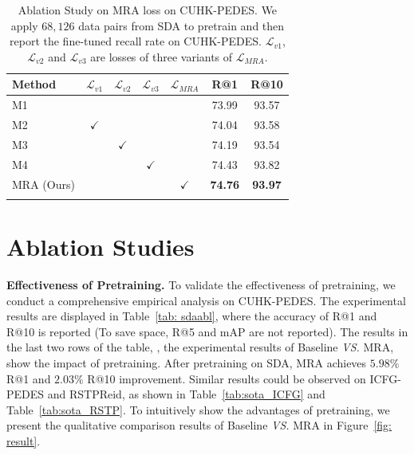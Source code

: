 \begin{table}[!t]
\caption{Ablation Study on MRA loss on CUHK-PEDES. We apply $68,126$ data pairs from SDA to pretrain and then report the fine-tuned recall rate on CUHK-PEDES. $\mathcal{L}_{v1}$, $\mathcal{L}_{v2}$ and $\mathcal{L}_{v3}$ are losses of three variants of $\mathcal{L}_{MRA}$.
}
\label{tab: abl}
\footnotesize
\centering
\begin{tabular}{l|cccc|cc}
\shline
Method & $\mathcal{L}_{v1}$ & $\mathcal{L}_{v2}$ & $\mathcal{L}_{v3}$ & $\mathcal{L}_{MRA}$ & R@1 & R@10 \\
\hline
M1   & & & &              & 73.99 & 93.57 \\
M2   & $\checkmark$ & & & & 74.04 & 93.58 \\
M3   & & $\checkmark$ & & & 74.19 & 93.54 \\
M4   & & & $\checkmark$ & & 74.43 & 93.82 \\
\hline
MRA (Ours)  & & & & $\checkmark$ & \textbf{74.76} & \textbf{93.97} \\
\shline
\end{tabular}
\end{table}



\section{Ablation Studies}

\noindent \textbf{Effectiveness of Pretraining.} 
To validate the effectiveness of pretraining, we conduct a comprehensive empirical analysis on CUHK-PEDES. The experimental results are displayed in Table~\ref{tab: sdaabl}, where the accuracy of R@1 and R@10 is reported (To save space, R@5 and mAP are not reported).
The results in the last two rows of the table, \ie, the experimental results of Baseline \emph{VS.} MRA, show the impact of pretraining. After pretraining on SDA, MRA achieves $5.98 \%$ R@1 and $2.03 \%$ R@10 improvement. 
Similar results could be observed on ICFG-PEDES and RSTPReid, as shown in Table~\ref{tab:sota_ICFG} and Table~\ref{tab:sota_RSTP}. 
To intuitively show the advantages of pretraining, we present the qualitative comparison results of Baseline \emph{VS.} MRA in Figure~\ref{fig: result}.


